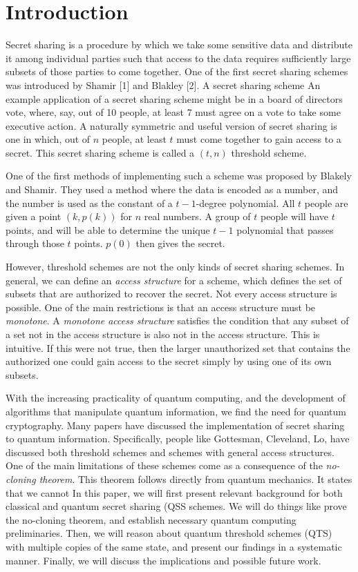 \chapter{Introduction}

Secret sharing is a procedure by which we take some sensitive data and distribute it among individual parties such that access to the data requires sufficiently large subsets of those parties to come together. One of the first secret sharing schemes was introduced by Shamir [1] and Blakley [2]. A secret sharing scheme An example application of a secret sharing scheme might be in a board of directors vote, where, say, out of 10 people, at least 7 must agree on a vote to take some executive action. A naturally symmetric and useful version of secret sharing is one in which, out of $n$ people, at least $t$ must come together to gain access to a secret. This secret sharing scheme is called a $(t,n)$ threshold scheme. 

One of the first methods of implementing such a scheme was proposed by Blakely and Shamir. They used a method where the data is encoded as a number, and the number is used as the constant of a $t-1$-degree polynomial. All $t$ people are given a point $(k, p(k))$ for $n$ real numbers. A group of $t$ people will have $t$ points, and will be able to determine the unique $t-1$ polynomial that passes through those $t$ points. $p(0)$ then gives the secret.

However, threshold schemes are not the only kinds of secret sharing schemes. In general, we can define an \textit{access structure} for a scheme, which defines the set of subsets that are authorized to recover the secret. Not every access structure is possible. One of the main restrictions is that an access structure must be \textit{monotone}. A \textit{monotone access structure} satisfies the condition that any subset of a set not in the access structure is also not in the access structure. This is intuitive. If this were not true, then the larger unauthorized set that contains the authorized one could gain access to the secret simply by using one of its own subsets. 

With the increasing practicality of quantum computing, and the development of algorithms that manipulate quantum information, we find the need for quantum cryptography. Many papers have discussed the implementation of secret sharing to quantum information. Specifically, people like Gottesman, Cleveland, Lo, have discussed both threshold schemes and schemes with general access structures. One of the main limitations of these schemes come as a consequence of the \textit{no-cloning theorem}. This theorem follows directly from quantum mechanics. It states that we cannot In this paper, we will first present relevant background for both classical and quantum secret sharing (QSS schemes. We will do things like prove the no-cloning theorem, and establish necessary quantum computing preliminaries. Then, we will reason about quantum threshold schemes (QTS) with multiple copies of the same state, and present our findings in a systematic manner. Finally, we will discuss the implications and possible future work.